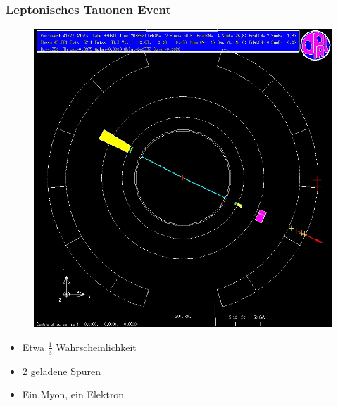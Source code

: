 \begin{frame}
	\frametitle{Leptonisches Tauonen Event}
		\begin{minipage}{0.54\linewidth}
			\begin{figure}
				\centering
				\includegraphics[width=1.0\linewidth]{graphics/tauonopalleptonisch}
			\end{figure}
		\end{minipage}
		\begin{minipage}{0.44\linewidth}
			\begin{center}
				\begin{itemize}
					\item Etwa $\frac{1}{3}$ Wahrscheinlichkeit\\\hfill
					\item 2 geladene Spuren\\\hfill
					\item Ein Myon, ein Elektron\\\hfill
				\end{itemize}
			\end{center}
		\end{minipage}
\end{frame}

